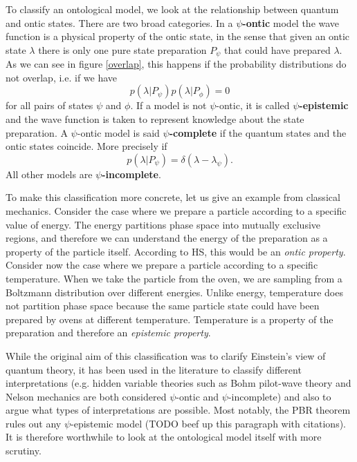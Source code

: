 \documentclass[twocolumn,prl,floatfix,superscriptaddress]{revtex4-2}
\begin{document}
To classify an ontological model, we look at the relationship between quantum and ontic states. There are two broad categories. In a \textbf{$\psi$-ontic} model the wave function is a physical property of the ontic state, in the sense that given an ontic state $\lambda$ there is only one pure state preparation $P_\psi$ that could have prepared $\lambda$. As we can see in figure \ref{overlap}, this happens if the probability distributions do not overlap, i.e. if we have
\begin{equation}\label{ontic_condition}
	p(\lambda | P_{\psi})p(\lambda|P_{\phi})=0
\end{equation}
for all pairs of states $\psi$ and $\phi$. If a model is not $\psi$-ontic, it is called \textbf{$\psi$-epistemic} and the wave function is taken to represent knowledge about the state preparation. A $\psi$-ontic model is said \textbf{$\psi$-complete} if the quantum states and the ontic states coincide. More precisely if 
\begin{equation}\label{complete_condition}
	p(\lambda|P_\psi)=\delta(\lambda-\lambda_{\psi}).
\end{equation}
All other models are \textbf{$\psi$-incomplete}.

To make this classification more concrete, let us give an example from classical mechanics. Consider the case where we prepare a particle according to a specific value of energy. The energy partitions phase space into mutually exclusive regions, and therefore we can understand the energy of the preparation as a property of the particle itself. According to HS, this would be an \emph{ontic property}. Consider now the case where we prepare a particle according to a specific temperature. When we take the particle from the oven, we are sampling from a Boltzmann distribution over different energies. Unlike energy, temperature does not partition phase space because the same particle state could have been prepared by ovens at different temperature. Temperature is a property of the preparation and therefore an \emph{epistemic property}.

While the original aim of this classification was to clarify Einstein's view of quantum theory, it has been used in the literature to classify different interpretations (e.g. hidden variable theories such as Bohm pilot-wave theory \cite{Bohm:1952aa} and Nelson mechanics \cite{Nelson:1966aa} are both considered $\psi$-ontic and $\psi$-incomplete) and also to argue what types of interpretations are possible. Most notably, the PBR theorem rules out any $\psi$-epistemic model (TODO beef up this paragraph with citations). It is therefore worthwhile to look at the ontological model itself with more scrutiny.
\end{document}
